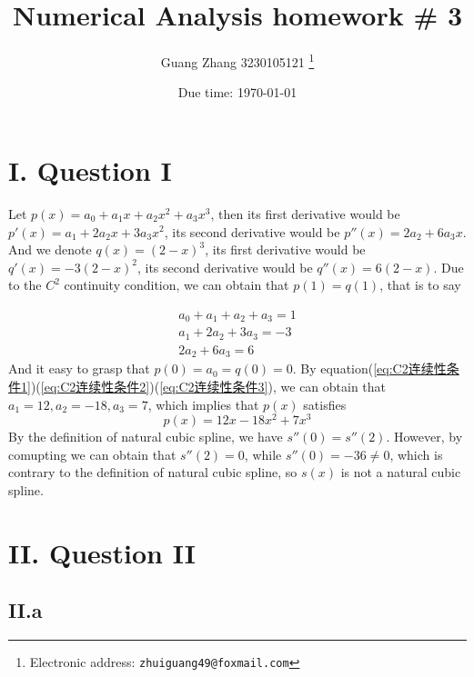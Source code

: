 \documentclass[a4paper]{article}
\begin{document}
\title{Numerical Analysis homework \# 3}

\author{Guang Zhang 3230105121
  \thanks{Electronic address: \texttt{zhuiguang49@foxmail.com}}}

\date{Due time: \today}

\maketitle






\section*{I. Question I}


Let $p(x)=a_0+a_1x+a_2x^2+a_3x^3$, then its first derivative would be $p'(x)=a_1+2a_2x+3a_3x^2$, its second derivative would be $p''(x)=2a_2+6a_3x$. And we denote $q(x)=(2-x)^3$, its first derivative would be
$q'(x)=-3(2-x)^2$, its second derivative would be $q''(x)=6(2-x)$. Due to the $C^2$ continuity condition, we can obtain that $p(1)=q(1)$, that is to say

\begin{align}
  a_0+a_1+a_2+a_3=1 \label{eq:C2连续性条件1}\\
  a_1+2a_2+3a_3=-3  \label{eq:C2连续性条件2}\\
  2a_2+6a_3=6       \label{eq:C2连续性条件3}
\end{align}
And it easy to grasp that $p(0)=a_0=q(0)=0$. By equation(\ref{eq:C2连续性条件1})(\ref{eq:C2连续性条件2})(\ref{eq:C2连续性条件3}), we can obtain that $a_1=12,a_2=-18,a_3=7$, which implies that $p(x)$ satisfies
\begin{equation}
  p(x) = 12x-18x^2+7x^3 \label{eq:p(x)}
\end{equation}
By the definition of natural cubic spline, we have $s''(0)=s''(2)$. However, by comupting we can obtain that $s''(2)=0$, while $s''(0)=-36\neq 0$, which is contrary to the definition of natural cubic spline, so $s(x)$ is not a natural cubic spline.  


\section*{II. Question II}

\subsection*{II.a}
\end{document}
